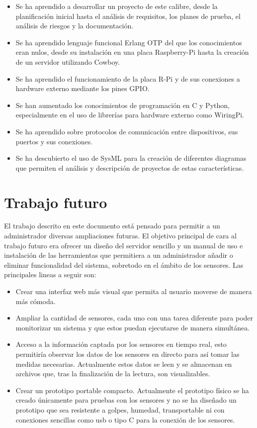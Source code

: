 \begin{itemize}
    \item Se ha aprendido a desarrollar un proyecto de este calibre, desde la planificación inicial hasta el análisis de requisitos, los planes de prueba, el análisis de riesgos y la documentación.
    \item Se ha aprendido lenguaje funcional Erlang OTP del que los conocimientos eran nulos, desde su instalación en una placa Raspberry-Pi hasta la creación de un servidor utilizando Cowboy.
    \item Se ha aprendido el funcionamiento de la placa R-Pi y de sus conexiones a hardware externo mediante los pines GPIO.
    \item Se han aumentado los conocimientos de programación en C y Python, especialmente en el uso de librerías para hardware externo como WiringPi.
    \item Se ha aprendido sobre protocolos de comunicación entre dispositivos, sus puertos y sus conexiones.
    \item Se ha descubierto el uso de SysML para la creación de diferentes diagramas que permiten el análisis y descripción de proyectos de estas características.
\end{itemize}

\section{Trabajo futuro}

El trabajo descrito en este documento está pensado para permitir a un administrador diversas ampliaciones futuras. El objetivo principal de cara al trabajo futuro era ofrecer un diseño del servidor sencillo y un manual de uso e instalación de las herramientas que permitiera a un administrador añadir o eliminar funcionalidad del sistema, sobretodo en el ámbito de los sensores. Las principales lineas a seguir son:

\begin{itemize}
    \item Crear una interfaz web más visual que permita al usuario moverse de manera más cómoda.
    \item Ampliar la cantidad de sensores, cada uno con una tarea diferente para poder monitorizar un sistema y que estos puedan ejecutarse de manera simultánea.
    \item Acceso a la información captada por los sensores en tiempo real, esto permitiría observar los datos de los sensores en directo para así tomar las medidas necesarias. Actualmente estos datos se leen y se almacenan en archivos que, tras la finalización de la lectura, son visualizables.
    \item Crear un prototipo portable compacto. Actualmente el prototipo físico se ha creado únicamente para pruebas con los sensores y no se ha diseñado un prototipo que sea resistente a golpes, humedad, transportable ni con conexiones sencillas como usb o tipo C para la conexión de los sensores.
    
\end{itemize}

